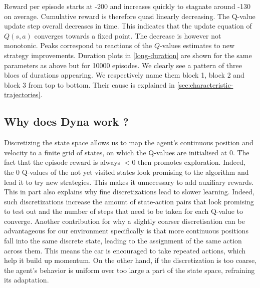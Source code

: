 \documentclass[a4paper, 12pt,oneside]{article}
\begin{document}
        Reward per episode starts at -200 and increases quickly to stagnate around -130 on average. Cumulative reward is therefore quasi linearly decreasing. 
        The Q-value update step overall decreases in time. This indicates that the update equation of $Q(s,a)$ converges towards a fixed point. The decrease is however not monotonic. Peaks correspond to reactions of the $Q$-values estimates to new strategy improvements.
        Duration plots in \ref{long-duration} are shown for the same parameters as above but for 10000 episodes. We clearly see a pattern of three blocs of durations appearing. We respectively name them block 1, block 2 and block 3 from top to bottom. Their cause is explained in \ref{sec:characteristic-trajectories}.
        
        \subsection{Why does Dyna work ?}
        Discretizing the state space allows us to map the agent's continuous position and velocity to a finite grid of states, on which the Q-values are initialised at 0. The fact that the episode reward is always $<$0 then promotes exploration. Indeed, the 0 Q-values of the not yet visited states look promising to the algorithm and lead it to try new strategies. This makes it unnecessary to add auxiliary rewards. This in part also explains why fine discretizations lead to slower learning. Indeed, such discretizations increase the amount of state-action pairs that look promising to test out and the number of steps that need to be taken for each Q-value to converge.
        Another contribution for why a slightly coarser discretisation can be advantageous for our environment specifically is that more continuous positions fall into the same discrete state, leading to the assignment of the same action across them. This means the car is encouraged to take repeated actions, which help it build up momentum. On the other hand, if the discretization is too coarse, the agent's behavior is uniform over too large a part of the state space, refraining its adaptation. 
\end{document}
